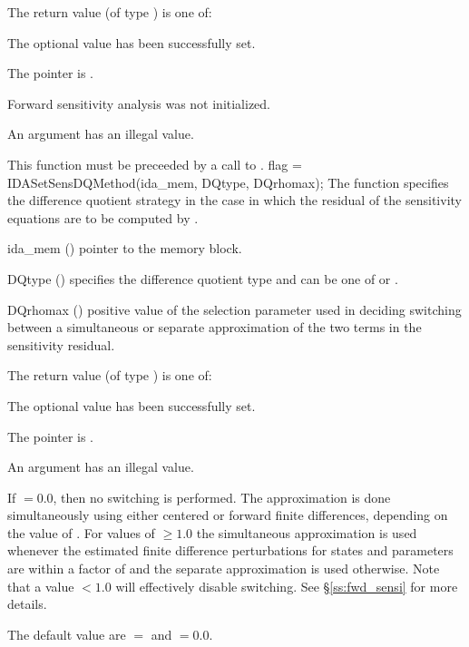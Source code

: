 {
  The return value  (of type ) is one of:
  \begin{args}
  \item[\Id{IDA\_SUCCESS}] 
    The optional value has been successfully set.
  \item[\Id{IDA\_MEM\_NULL}]
    The  pointer is .
  \item[\Id{IDA\_NO\_SENS}]
    Forward sensitivity analysis was not initialized.
  \item[\Id{IDA\_ILL\_INPUT}]
    An argument has an illegal value.
  \end{args}
}
{
  {\warn}This function must be preceeded by a call to .
}
{
  flag = IDASetSensDQMethod(ida\_mem, DQtype, DQrhomax);
}
{
  The function  specifies the difference quotient strategy in
  the case in which the residual of the sensitivity equations are to
  be computed by {\idas}.
}
{
  \begin{args}
  \item[ida\_mem] ()
    pointer to the {\idas} memory block.
  \item[DQtype] ()
    specifies the difference quotient type and can be one of 
    or .
  \item[DQrhomax] ()
    positive value of the selection parameter used in deciding switching between a simultaneous
    or separate approximation of the two terms in the sensitivity residual.
  \end{args}
}
{
  The return value  (of type ) is one of:
  \begin{args}
  \item[\Id{IDA\_SUCCESS}]
    The optional value has been successfully set.
  \item[\Id{IDA\_MEM\_NULL}]
    The  pointer is .
  \item[\Id{IDA\_ILL\_INPUT}]
    An argument has an illegal value.
  \end{args}
}
{
  If  $= 0.0$, then no switching is performed. The approximation is done simultaneously
  using either centered or forward finite differences, depending on the value of . 
  For values of  $\ge 1.0$ the simultaneous approximation is used whenever the 
  estimated finite difference perturbations for states and parameters are within a factor of
   and the separate approximation is used otherwise. Note that a value 
   $< 1.0$ will effectively disable switching.   
  See \S\ref{ss:fwd_sensi} for more details.

  The default value are $=$ and $=0.0$. 
}

